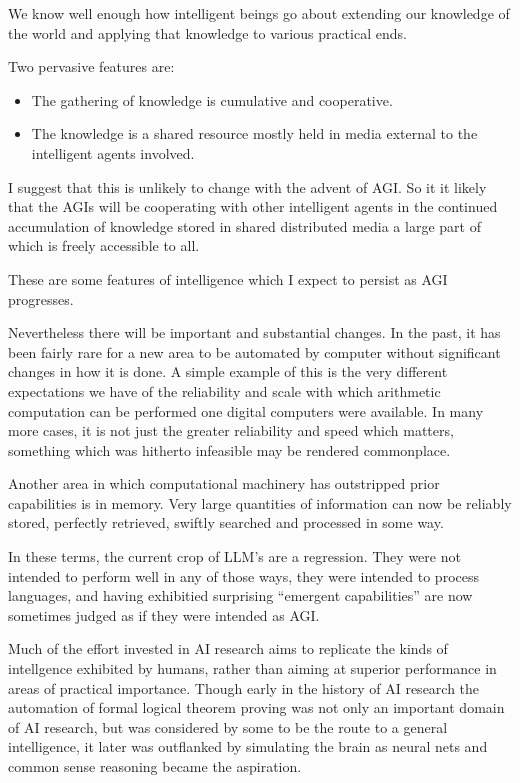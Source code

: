 \documentclass[10pt,titlepage]{book}
\begin{document}
We know well enough how intelligent beings go about extending our knowledge of the world and applying that knowledge to various practical ends.

Two pervasive features are:
\begin{itemize}
\item The gathering of knowledge is cumulative and cooperative.
\item The knowledge is a shared resource mostly held in media external to the intelligent agents involved.
\end{itemize}

I suggest that this is unlikely to change with the advent of AGI.
So it it likely that the AGIs will be cooperating with other intelligent agents in the continued accumulation of knowledge stored in shared distributed media a large part of which is freely accessible to all.

These are some features of intelligence which I expect to persist as AGI progresses.

Nevertheless there will be important and substantial changes.
In the past, it has been fairly rare for a new area to be automated by computer without significant changes in how it is done.
A simple example of this is the very different expectations we have of the reliability and scale with which arithmetic computation can be performed one digital computers were available.
In many more cases, it is not just the greater reliability and speed which matters, something which was hitherto infeasible may be rendered commonplace.

Another area in which computational machinery has outstripped prior capabilities is in memory.
Very large quantities of information can now be reliably stored, perfectly retrieved, swiftly searched and processed in some way.

In these terms, the current crop of LLM's are a regression.
They were not intended to perform well in any of those ways, they were intended to process languages, and having exhibitied surprising ``emergent capabilities'' are now sometimes judged as if they were intended as AGI.

Much of the effort invested in AI research aims to replicate the kinds of intellgence exhibited by humans, rather than aiming at superior performance in areas of practical importance.
Though early in the history of AI research the automation of formal logical theorem proving was not only an important domain of AI research, but was considered by some to be the route to a general intelligence, it later was outflanked by simulating the brain as neural nets and common sense reasoning became the aspiration.
\end{document}
